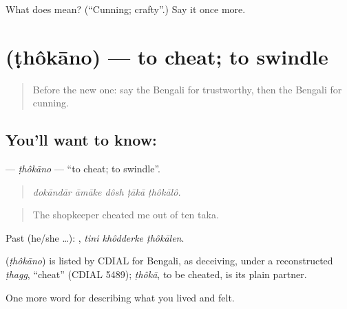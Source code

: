 \begin{tcolorbox}[breakable,colback=teal!4,colframe=teal!35!black,title={Before you move on}]
What does  mean? (\textquotedblleft{}Cunning; crafty\textquotedblright{}.) Say it once more.
\end{tcolorbox}
\section[\texorpdfstring{\bn{ঠকানো} (ṭhôkāno)}{ঠকানো (ṭhôkāno)}]{ (ṭhôkāno) — to cheat; to swindle}

\label{lesson:BN-C458-thokano}



\begin{quote}
Before the new one: say the Bengali for trustworthy, then the Bengali for cunning.
\end{quote}

\subsection*{You'll want to know: }
\textbf{} — \emph{ṭhôkāno} — \textquotedblleft{}to cheat; to swindle\textquotedblright{}.

\begin{quote}
    
\end{quote}

\begin{quote}
\emph{dokāndār āmāke dôsh ṭākā ṭhôkālô.}
\end{quote}

\begin{quote}
The shopkeeper cheated me out of ten taka.
\end{quote}

Past (he/she …):   , \emph{tini khôdderke ṭhôkālen}.

\begin{cousinweb}
\textbf{} (\emph{ṭhôkāno}) is listed by CDIAL for Bengali, as deceiving, under a reconstructed \emph{ṭhagg}, \textquotedblleft{}cheat\textquotedblright{} (CDIAL 5489); \emph{ṭhôkā}, to be cheated, is its plain partner.
\end{cousinweb}

\begin{grammarlens}[title={What you've built}]
One more word for describing what you lived and felt.
\end{grammarlens}

